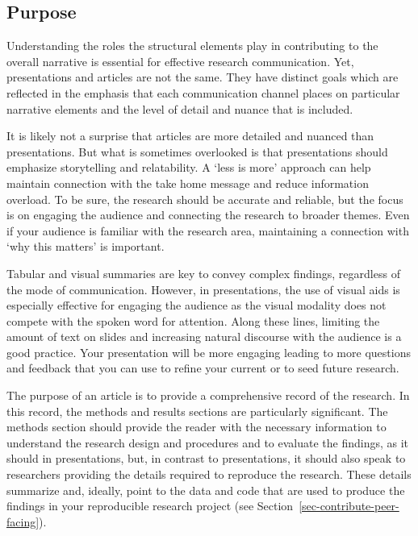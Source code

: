 \documentclass[
  letterpaper,
]{latex/krantz}
\theoremstyle{definition}
\theoremstyle{remark}
\begin{document}
\subsection{Purpose}\label{sec-contribute-public-purpose}

Understanding the roles the structural elements play in contributing to
the overall narrative is essential for effective research communication.
Yet, presentations and articles are not the same. They have distinct
goals which are reflected in the emphasis that each communication
channel places on particular narrative elements and the level of detail
and nuance that is included.

It is likely not a surprise that articles are more detailed and nuanced
than presentations. But what is sometimes overlooked is that
presentations should emphasize storytelling and relatability. A `less is
more' approach can help maintain connection with the take home message
and reduce information overload. To be sure, the research should be
accurate and reliable, but the focus is on engaging the audience and
connecting the research to broader themes. Even if your audience is
familiar with the research area, maintaining a connection with `why this
matters' is important.

Tabular and visual summaries are key to convey complex findings,
regardless of the mode of communication. However, in presentations, the
use of visual aids is especially effective for engaging the audience as
the visual modality does not compete with the spoken word for attention.
Along these lines, limiting the amount of text on slides and increasing
natural discourse with the audience is a good practice. Your
presentation will be more engaging leading to more questions and
feedback that you can use to refine your current or to seed future
research.

The purpose of an article is to provide a comprehensive record of the
research. In this record, the methods and results sections are
particularly significant. The methods section should provide the reader
with the necessary information to understand the research design and
procedures and to evaluate the findings, as it should in presentations,
but, in contrast to presentations, it should also speak to researchers
providing the details required to reproduce the research. These details
summarize and, ideally, point to the data and code that are used to
produce the findings in your reproducible research project (see
Section~\ref{sec-contribute-peer-facing}).
\end{document}

